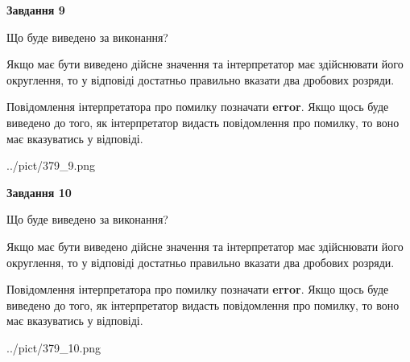 \documentclass[12pt, ukrainian]{article}
\begin{document}
{\begin {Large}
{\begin {center}\textbf{Завдання 9}\end {center}}\par
Що буде виведено за виконання? \par

Якщо має бути виведено дійсне значення та інтерпретатор має здійснювати його округлення, 
то у відповіді достатньо правильно вказати два дробових розряди.

Повідомлення інтерпретатора про помилку позначати \textbf{error}.
Якщо щось буде виведено до того, як інтерпретатор видасть повідомлення про помилку, 
то воно має вказуватись у відповіді. \par

\begin{center}
	{../pict/379_9.png}
\end{center}
\newpage

{\begin {center}\textbf{Завдання 10}\end {center}}\par
Що буде виведено за виконання? \par

Якщо має бути виведено дійсне значення та інтерпретатор має здійснювати його округлення, 
то у відповіді достатньо правильно вказати два дробових розряди.

Повідомлення інтерпретатора про помилку позначати \textbf{error}.
Якщо щось буде виведено до того, як інтерпретатор видасть повідомлення про помилку, 
то воно має вказуватись у відповіді. \par

\begin{center}
	{../pict/379_10.png}
\end{center}
\newpage

\end {Large}}
\end{document}

